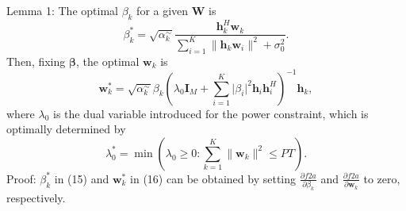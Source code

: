 \documentclass[review]{elsarticle}
\begin{document}
		Lemma 1: The optimal $\beta_k$ for a given $\mathbf{W}$ is
		\[
		\beta_k^* = \sqrt{\alpha_k^\sim} \frac{{\mathbf{h}_k^H \mathbf{w}_k}}{{\sum_{i=1}^{K} \lVert \mathbf{h}_k \mathbf{w}_i \rVert^2 + \sigma_0^2}}.
		\]
		Then, fixing $\boldsymbol{\beta}$, the optimal $\mathbf{w}_k$ is
		\[
		\mathbf{w}_k^* = \sqrt{\alpha_k^\sim} \beta_k \left( \lambda_0 \mathbf{I}_M + \sum_{i=1}^{K} \lvert \beta_i \rvert^2 \mathbf{h}_i \mathbf{h}_i^H \right)^{-1} \mathbf{h}_k,
		\]
		where $\lambda_0$ is the dual variable introduced for the power constraint, which is optimally determined by
		\[
		\lambda_0^* = \min \left( \lambda_0 \geq 0 : \sum_{k=1}^{K} \lVert \mathbf{w}_k \rVert^2 \leq PT \right).
		\]
		Proof: $\beta_k^*$ in (15) and $\mathbf{w}_k^*$ in (16) can be obtained by setting $\frac{{\partial f2a}}{{\partial \beta_k}}$ and $\frac{{\partial f2a}}{{\partial \mathbf{w}_k}}$ to zero, respectively.
		
\end{document}
